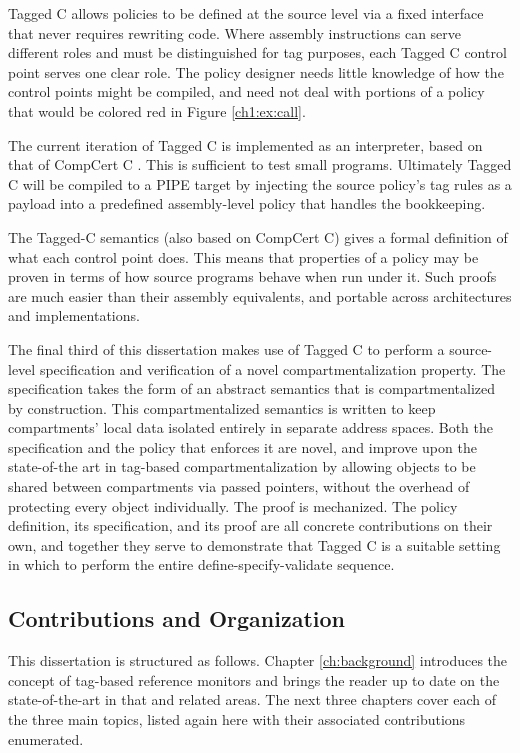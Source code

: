 Tagged C allows policies to be defined at the source level via a fixed interface
that never requires rewriting code. Where assembly instructions can serve different roles and must
be distinguished for tag purposes, each Tagged C control point serves one clear role. The policy
designer needs little knowledge of how the control points might be compiled, and need not
deal with portions of a policy that would be colored red in Figure \ref{ch1:ex:call}.

The current iteration of Tagged C is implemented as an interpreter, based on that of
CompCert C \cite{Leroy09:CompCert}. This is sufficient to test small programs. Ultimately
Tagged C will be compiled to a PIPE target by injecting the source policy's tag rules
as a payload into a predefined assembly-level policy that handles the bookkeeping.

The Tagged-C semantics (also based on CompCert C) gives a formal definition of what each
control point does. This means that properties of a policy may be proven in terms of how
source programs behave when run under it. Such proofs are much easier than their
assembly equivalents, and portable across architectures and implementations.

The final third of this dissertation makes use of Tagged C to perform a source-level specification and
verification of a novel compartmentalization property. The specification takes the form of
an abstract semantics that is compartmentalized by construction. This compartmentalized semantics
is written to keep compartments' local data isolated entirely in separate address spaces.
Both the specification and the policy that enforces it are novel, and improve upon the
state-of-the art in tag-based compartmentalization by allowing objects to be shared between
compartments via passed pointers, without the overhead of protecting every object individually.
The proof is mechanized. The policy definition, its
specification, and its proof are all concrete contributions on their own, and together they
serve to demonstrate that Tagged C is a suitable setting in which to perform the entire
define-specify-validate sequence.

\subsection{Contributions and Organization}

This dissertation is structured as follows.
Chapter \ref{ch:background} introduces the concept of tag-based reference monitors
and brings the reader up to date on the state-of-the-art in that and related areas.
The next three chapters cover each of the three main topics, listed again here with
their associated contributions enumerated.

